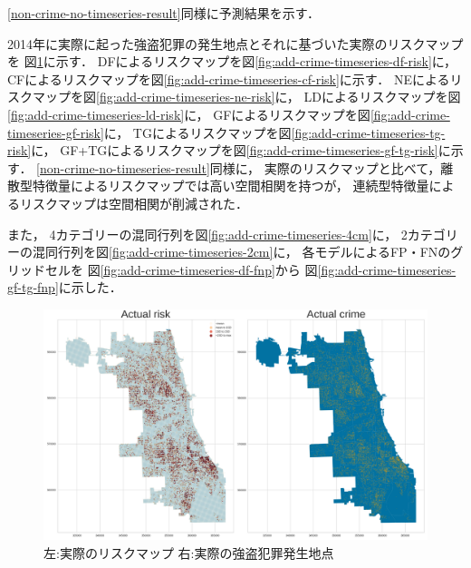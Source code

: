 
\ref{non-crime-no-timeseries-result}同様に予測結果を示す．

2014年に実際に起った強盗犯罪の発生地点とそれに基づいた実際のリスクマップを
図\ref{fig:add-crime-timeseries-actual-risk}に示す．
DFによるリスクマップを図\ref{fig:add-crime-timeseries-df-risk}に，
CFによるリスクマップを図\ref{fig:add-crime-timeseries-cf-risk}に示す．
NEによるリスクマップを図\ref{fig:add-crime-timeseries-ne-risk}に，
LDによるリスクマップを図\ref{fig:add-crime-timeseries-ld-risk}に，
GFによるリスクマップを図\ref{fig:add-crime-timeseries-gf-risk}に，
TGによるリスクマップを図\ref{fig:add-crime-timeseries-tg-risk}に，
GF+TGによるリスクマップを図\ref{fig:add-crime-timeseries-gf-tg-risk}に示す．
\ref{non-crime-no-timeseries-result}同様に，
実際のリスクマップと比べて，離散型特徴量によるリスクマップでは高い空間相関を持つが，
連続型特徴量によるリスクマップは空間相関が削減された．

また，
4カテゴリーの混同行列を図\ref{fig:add-crime-timeseries-4cm}に，
2カテゴリーの混同行列を図\ref{fig:add-crime-timeseries-2cm}に，
各モデルによるFP・FNのグリッドセルを
図\ref{fig:add-crime-timeseries-df-fnp}から
図\ref{fig:add-crime-timeseries-gf-tg-fnp}に示した．

\begin{figure}
  \centering %
  \includegraphics[scale=0.25]{./util-fig/actual_risk_point_map.png}
  \caption{左:実際のリスクマップ 右:実際の強盗犯罪発生地点}
  \label{fig:add-crime-timeseries-actual-risk}
\end{figure}

